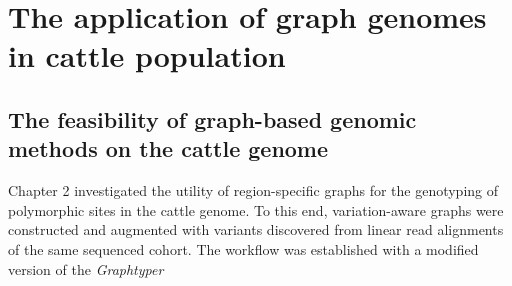 \documentclass[../main.tex]{subfiles}
\begin{document}
\section{The application of graph genomes in cattle population}

\subsection*{The feasibility of graph-based genomic methods on the cattle genome}


Chapter 2 investigated the utility of region-specific graphs for the genotyping of polymorphic sites in the cattle genome. To this end, variation-aware graphs were constructed and augmented with variants discovered from linear read alignments of the same sequenced cohort. The workflow was established with a modified version of the \emph{Graphtyper} 
\end{document}
